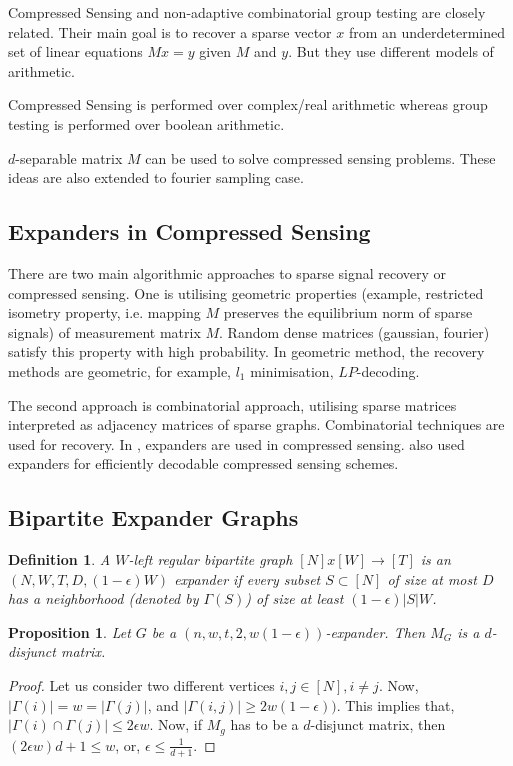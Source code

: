 \documentclass{article}
\newtheorem{proposition}{Proposition}
\newtheorem{definition}{Definition}
\begin{document}
Compressed Sensing and non-adaptive combinatorial group testing are closely
related. Their main goal is to recover a sparse vector $x$ from an underdetermined
set of linear equations $Mx = y$ given $M$ and $y$. But they use different models
of arithmetic.

Compressed Sensing is performed over complex/real arithmetic whereas group testing
is performed over boolean arithmetic.

$d$-separable matrix $M$ can be used to solve compressed sensing problems\cite{cormode2006combinatorial}.
These ideas are also extended to fourier sampling case\cite{iwen2008deterministic}.

\subsection{Expanders in Compressed Sensing}

There are two main algorithmic approaches to sparse signal recovery or compressed
sensing. One is utilising geometric properties (example, restricted isometry property,
i.e. mapping $M$ preserves the equilibrium norm of sparse signals) of measurement matrix $M$.
Random dense matrices (gaussian, fourier) satisfy this property with high probability.
In geometric method, the recovery methods are geometric, for example, $l_1$ minimisation,
$LP$-decoding\cite{berinde2008combining}.

The second approach is combinatorial approach, utilising sparse matrices interpreted as
adjacency matrices of sparse graphs. Combinatorial techniques are used for recovery. In
\citeauthor*{berinde2008combining}\cite{berinde2008combining}, expanders are used in
compressed sensing. \citeauthor*{jafarpour2009efficient}\cite{jafarpour2009efficient}
also used expanders for efficiently decodable compressed sensing schemes.

\subsection{Bipartite Expander Graphs}

\begin{definition}
  A $W$-left regular bipartite graph $[N]x[W] \rightarrow [T]$ is an
  $(N, W, T, D, (1-\epsilon)W)$ expander if every subset $S \subset [N]$
  of size at most $D$ has a neighborhood (denoted by $\Gamma(S)$) of size
  at least $(1-\epsilon)|S|W$.
\end{definition}

\begin{proposition}
  Let $G$ be a $(n,w,t,2,w(1-\epsilon))$-expander.
  Then $M_G$ is a $d$-disjunct matrix.\cite{indyk2010efficiently}
\end{proposition}
\begin{proof}
  Let us consider two different vertices $i,j \in [N], i \ne j$.
  Now, $|\Gamma({i})| = w = |\Gamma({j})|$, and $|\Gamma({i,j})| \ge 2w(1-\epsilon))$.
  This implies that, $|\Gamma({i}) \cap \Gamma({j})| \le 2\epsilon w$.
  Now, if $M_g$ has to be a $d$-disjunct matrix, then
  $(2\epsilon w)d + 1 \le w$, or, $\epsilon \le \frac{1}{d+1}$.
\end{proof}
\end{document}
